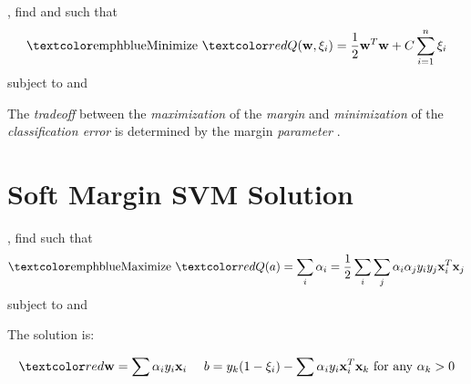 \documentclass[
	number={2},
	title={Learning Linear Separators{,} SVMs and Kernels}
]{cs584notes}
\begin{document}
\begin{svmbox}
	, find  and  such that
	\[ \mbox{\emph{Minimize} } \data{ Q(\vec{w}, \xi_{i}) = \frac{1}{2}\vec{w}^{T}\vec{w} + C\sum_{i=1}^{n}\xi_{i} } \]
	subject to  and 
\end{svmbox}

The \emph{tradeoff} between the \emph{maximization} of the \emph{margin} and \emph{minimization} of the \emph{classification error} is determined by the margin \emph{parameter} .

\section{Soft Margin SVM Solution}\label{sec:soft-margin-svm-solution}
\begin{svmbox}
	, find  such that
	\[ \mbox{\emph{Maximize} } \data{ Q(a) = \sum_{i}\alpha_{i} = \frac{1}{2}\sum_{i} \sum_{j} \alpha_{i} \alpha_{j} y_{i} y_{j} \vec{x}_{i}^{T} \vec{x}_{j} } \]
	subject to  and 
\end{svmbox}

The solution is:
\begin{svmbox}
	\[ \data{ \vec{w} = \sum \alpha_{i} y_{i} \vec{x}_{i}\ \ \ \ b = y_{k}(1 - \xi_{i}) - \sum \alpha_{i} y_{i} \vec{x}_{i}^{T} \vec{x}_{k} \mbox{   for any } \alpha_{k} > 0 } \]
\end{svmbox}
\end{document}
